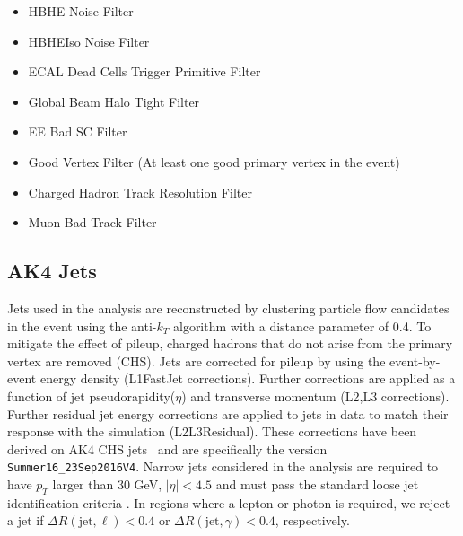 \begin{itemize}
\item HBHE Noise Filter
\item HBHEIso Noise Filter
\item ECAL Dead Cells Trigger Primitive Filter
\item Global Beam Halo Tight Filter
\item EE Bad SC Filter
\item Good Vertex Filter (At least one good primary vertex in the event)
\item Charged Hadron Track Resolution Filter
\item Muon Bad Track Filter
\end{itemize}


\subsection{AK4 Jets}\label{jet}

Jets used in the analysis are reconstructed by clustering particle flow candidates in the event using the anti-$k_T$ algorithm \cite{Cacciari:2008gp} with a distance parameter of 0.4. To mitigate the effect of pileup, charged hadrons that do not arise from the primary vertex are removed (CHS). 
Jets are corrected for pileup by using the event-by-event energy density (L1FastJet corrections). 
Further corrections are applied as a function of jet pseudorapidity($\eta$) and transverse momentum (L2,L3 corrections). 
Further residual jet energy corrections are applied to jets in data to match their response with the simulation (L2L3Residual).
These corrections have been derived on AK4 CHS jets~\cite{JEC_TWIKI} and are specifically the version \verb|Summer16_23Sep2016V4|.
Narrow jets considered in the analysis are required to have $p_T$ larger than 30 GeV, $|\eta| < 4.5$ and must pass the standard loose jet identification criteria \cite{TWIKI-JETID}.
In regions where a lepton or photon is required, we reject a jet if $\Delta R(\text{jet},\ell)<0.4$ or $\Delta R(\text{jet},\gamma)<0.4$, respectively.


